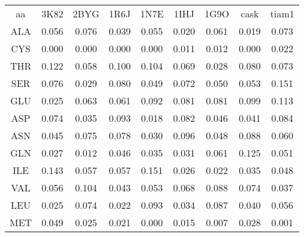     \begin{table}[!htbp]
      \centering

      \begin{tabular}{ccccccccc}

        \toprule
        aa & 3K82 & 2BYG & 1R6J & 1N7E & 1IHJ & 1G9O & cask & tiam1 \\
        \cmidrule{1-9}

   ALA  & 0.056  &  0.076  &   0.039  &   0.055  &   0.020 &   0.061  &   0.019  &   0.073 \\                                         
   CYS  & 0.000  &  0.000  &   0.000  &   0.000  &   0.011 &   0.012  &   0.000  &   0.022 \\                                           
   THR  & 0.122  &  0.058  &   0.100  &   0.104  &   0.069 &   0.028  &   0.080  &   0.073 \\                                        
        \cmidrule{1-9}
   SER  & 0.076  &  0.029  &   0.080  &   0.049  &   0.072 &   0.050  &   0.053  &   0.151 \\                                          
        \cmidrule{1-9}
   GLU  & 0.025  &  0.063  &   0.061  &   0.092  &   0.081 &   0.081  &   0.099  &   0.113 \\                                           
   ASP  & 0.074  &  0.035  &   0.093  &   0.018  &   0.082 &   0.046  &   0.041  &   0.084 \\                                           
        \cmidrule{1-9}
   ASN  & 0.045  &  0.075  &   0.078  &   0.030  &   0.096 &   0.048  &   0.088  &   0.060 \\                                         
   GLN  & 0.027  &  0.012  &   0.046  &   0.035  &   0.031 &   0.061  &   0.125  &   0.051 \\                                            
        \cmidrule{1-9}
   ILE  & 0.143  &  0.057  &   0.057  &   0.151  &   0.026 &   0.022  &   0.035  &   0.048 \\                                               
   VAL  & 0.056  &  0.104  &   0.043  &   0.053  &   0.068 &   0.088  &   0.074  &   0.037 \\                                        
   LEU  & 0.025  &  0.074  &   0.022  &   0.093  &   0.034 &   0.087  &   0.040  &   0.056 \\                                          
        \cmidrule{1-9}
   MET  & 0.049  &  0.025  &   0.021  &   0.000  &   0.015 &   0.007  &   0.028  &   0.001 \\                                          

\end{tabular}
\end{table}
